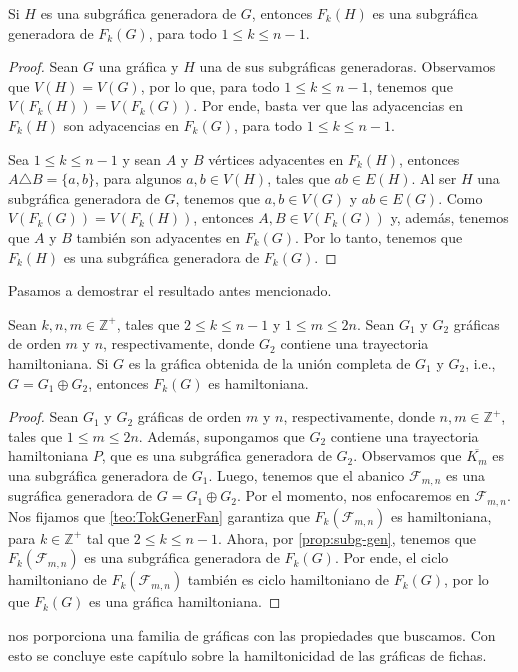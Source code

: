 \begin{proposicion}
\label{prop:subg-gen}
    Si $H$ es una subgr\'afica generadora de $G$, entonces $F_k(H)$ es una
    subgr\'afica generadora de $F_k(G)$, para todo $1 \leq k \leq n-1$.
\end{proposicion}

\begin{proof}
    Sean $G$ una gr\'afica y $H$ una de sus subgr\'aficas generadoras.
    Observamos que $V(H)=V(G)$, por lo que, para todo $1 \leq k \leq n-1$,
    tenemos que $V(F_k(H))=V(F_k(G))$. Por ende, basta ver que las adyacencias
    en $F_k(H)$ son adyacencias en $F_k(G)$, para todo $1 \leq k \leq n-1$.

    Sea $1 \leq k \leq n-1$ y sean $A$ y $B$ v\'ertices adyacentes en $F_k(H)$,
    entonces $ A \triangle B = \{a,b\}$, para algunos $a,b \in V(H)$, tales que
    $ab \in E(H)$. Al ser $H$ una subgr\'afica generadora de $G$, tenemos que
    $a,b \in V(G)$ y $ab \in E(G)$. Como $V(F_k(G))=V(F_k(H))$, entonces $A,B
    \in V(F_k(G))$ y, adem\'as, tenemos que $A$ y $B$ tambi\'en son adyacentes
    en $F_k(G)$. Por lo tanto, tenemos que $F_k(H)$ es una subgr\'afica
    generadora de $F_k(G)$.
\end{proof}

Pasamos a demostrar el resultado antes mencionado.

\begin{corolario}
\label{coro:Token-Join}
    Sean $k,n,m \in \mathbb{Z^{+}}$, tales que $2 \leq k \leq n-1$ y $1 \leq m
    \leq 2n$. Sean $G_1$ y $G_2$ gr\'aficas de orden $m$ y $n$, respectivamente,
    donde $G_2$ contiene una trayectoria hamiltoniana. Si $G$ es la gr\'afica
    obtenida de la uni\'on completa de $G_1$ y $G_2$, i.e., $G = G_1 \oplus
    G_2$, entonces $F_k(G)$ es hamiltoniana. 
\end{corolario}

\begin{proof}
    Sean $G_1$ y $G_2$ gr\'aficas de orden $m$ y $n$, respectivamente, donde
    $n,m \in \mathbb{Z^{+}}$, tales que $1 \leq m \leq 2n$. Adem\'as, supongamos
    que $G_2$ contiene una trayectoria hamiltoniana $P$, que es una subgr\'afica
    generadora de $G_2$. Observamos que $\overline{K_m}$ es una subgr\'afica
    generadora de $G_1$. Luego, tenemos que el abanico $\mathcal{F}_{m,n}$ es
    una sugr\'afica generadora de $G= G_1 \oplus G_2$. Por el momento, nos
    enfocaremos en $\mathcal{F}_{m,n}$. Nos fijamos que \cref{teo:TokGenerFan}
    garantiza que $F_k(\mathcal{F}_{m,n})$ es hamiltoniana, para $k \in
    \mathbb{Z^{+}}$ tal que $2 \leq k \leq n-1$. Ahora, por
    \cref{prop:subg-gen}, tenemos que $F_k(\mathcal{F}_{m,n})$ es una
    subgr\'afica generadora de $F_k(G)$. Por ende, el ciclo hamiltoniano de
    $F_k(\mathcal{F}_{m,n})$ tambi\'en es ciclo hamiltoniano de $F_k(G)$, por lo
    que $F_k(G)$ es una gr\'afica hamiltoniana.
\end{proof}

 nos porporciona una familia de gr\'aficas con las
propiedades que buscamos. Con esto se concluye este cap\'itulo sobre la
hamiltonicidad de las gr\'aficas de fichas.
